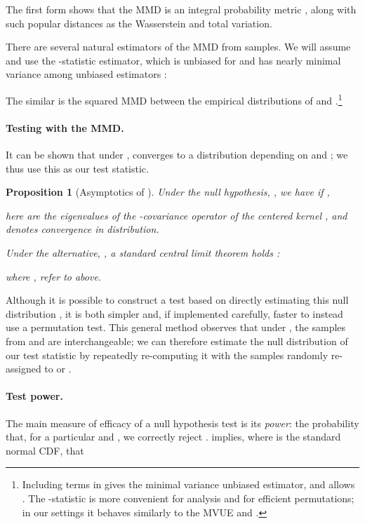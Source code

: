 \documentclass{article}
\newtheorem{prop}[theorem]{Proposition}  \crefname{prop}{Proposition}{Propositions}
\begin{document}
The first form shows that the MMD is an integral probability metric \citep{muller1997integral},
along with such popular distances as the Wasserstein and total variation.

There are several natural estimators of the MMD from samples.
We will assume 
and use the -statistic estimator,
which is unbiased for  and has nearly minimal variance among unbiased estimators \citep{Gretton2012}:

The similar  is
the squared MMD between the empirical distributions of  and .\footnote{Including  terms in  gives the minimal variance unbiased estimator, and allows . The -statistic is more convenient for analysis and for efficient permutations; in our settings it behaves similarly to the MVUE and .}{}

\paragraph{Testing with the MMD.}
It can be shown that under ,
 converges to a distribution depending on  and ;
we thus use this as our test statistic.

\begin{prop}[Asymptotics of ] \label{prop:asymptotics}
Under the null hypothesis, ,
we have
if ,

here  are
the eigenvalues of the -covariance operator of the centered kernel
\citep[Theorem 12]{Gretton2012},
and  denotes convergence in distribution.


Under the alternative, ,
a standard central limit theorem holds
\citep[Section 5.5.1]{serfling}:

where ,  refer to  above.
\end{prop}

Although it is possible to construct a test based on directly estimating this null distribution \citep{eig-mmd-null},
it is both simpler and, if implemented carefully, faster \citep{sutherland:mmd-opt} to instead use a permutation test.
This general method \citep{dwass1957,AlbaFernandez2008} observes that under ,
the samples from  and  are interchangeable;
we can therefore estimate the null distribution of our test statistic
by repeatedly re-computing it with the samples randomly re-assigned to  or .

\paragraph{Test power.}
The main measure of efficacy of a null hypothesis test is its \emph{power}:
the probability that, for a particular  and , we correctly reject .
 implies,
where  is the standard normal CDF,
that
\end{document}
